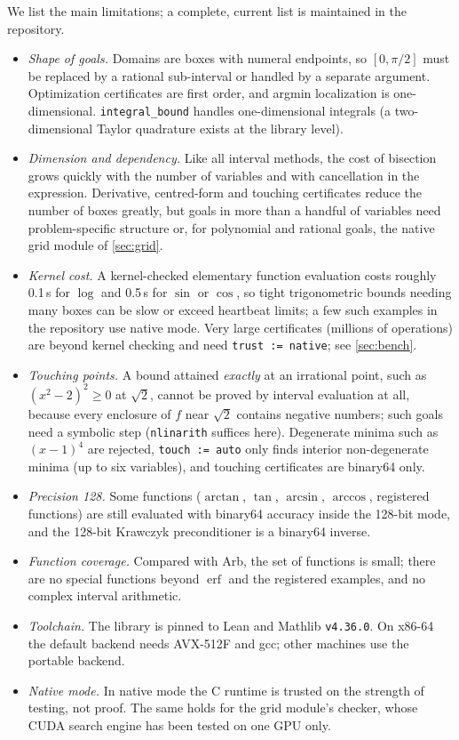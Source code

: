 \documentclass[11pt]{article}
\theoremstyle{definition}
\theoremstyle{remark}
\newcommand{\lean}[1]{\texttt{#1}}
\begin{document}
We list the main limitations; a complete, current list is maintained in the
repository.
\begin{itemize}[nosep]
\item \emph{Shape of goals.} Domains are boxes with numeral endpoints, so
  $[0,\pi/2]$ must be replaced by a rational sub-interval or handled by a
  separate argument. Optimization certificates are first order, and argmin
  localization is one-dimensional. \lean{integral\_bound} handles
  one-dimensional integrals (a two-dimensional Taylor quadrature exists at
  the library level).
\item \emph{Dimension and dependency.} Like all interval methods, the cost
  of bisection grows quickly with the number of variables and with
  cancellation in the expression. Derivative, centred-form and touching
  certificates reduce the number of boxes greatly, but goals in more than a
  handful of variables need problem-specific structure or, for polynomial
  and rational goals, the native grid module of \cref{sec:grid}.
\item \emph{Kernel cost.} A kernel-checked elementary function evaluation
  costs roughly 0.1\,s for $\log$ and 0.5\,s for $\sin$ or $\cos$, so tight
  trigonometric bounds needing many boxes can be slow or exceed heartbeat
  limits; a few such examples in the repository use native mode. Very large
  certificates (millions of operations) are beyond kernel checking and need
  \lean{trust := native}; see \cref{sec:bench}.
\item \emph{Touching points.} A bound attained \emph{exactly} at an
  irrational point, such as $(x^2-2)^2\ge0$ at $\sqrt2$, cannot be proved by
  interval evaluation at all, because every enclosure of $f$ near $\sqrt2$
  contains negative numbers; such goals need a symbolic step
  (\lean{nlinarith} suffices here). Degenerate minima such as $(x-1)^4$ are
  rejected, \lean{touch := auto} only finds interior non-degenerate minima
  (up to six variables), and touching certificates are binary64 only.
\item \emph{Precision 128.} Some functions ($\arctan$, $\tan$, $\arcsin$,
  $\arccos$, registered functions) are still evaluated with binary64
  accuracy inside the 128-bit mode, and the 128-bit Krawczyk preconditioner
  is a binary64 inverse.
\item \emph{Function coverage.} Compared with Arb, the set of functions is
  small; there are no special functions beyond $\operatorname{erf}$ and the
  registered examples, and no complex interval arithmetic.
\item \emph{Toolchain.} The library is pinned to Lean and Mathlib
  \lean{v4.36.0}. On x86-64 the default backend needs AVX-512F and gcc;
  other machines use the portable backend.
\item \emph{Native mode.} In native mode the C runtime is trusted on the
  strength of testing, not proof. The same holds for the grid module's
  checker, whose CUDA search engine has been tested on one GPU only.
\end{itemize}
\end{document}
